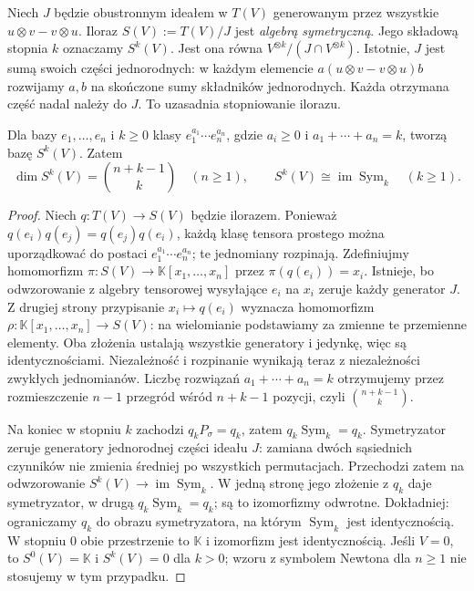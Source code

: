 \begin{definicja}
\label{def:algebra-symetryczna}
Niech $J$ będzie obustronnym ideałem w $T(V)$ generowanym
przez wszystkie $u\otimes v-v\otimes u$. Iloraz
$S(V):=T(V)/J$ jest \emph{algebrą symetryczną}.
Jego składową stopnia $k$ oznaczamy $S^k(V)$.
Jest ona równa $V^{\otimes k}/(J\cap V^{\otimes k})$.
Istotnie, $J$ jest sumą swoich części jednorodnych:
w każdym elemencie $a(u\otimes v-v\otimes u)b$ rozwijamy
$a,b$ na skończone sumy składników jednorodnych. Każda
otrzymana część nadal należy do $J$. To uzasadnia stopniowanie ilorazu.
\end{definicja}

\begin{stwierdzenie}
\label{prop:sym-baza}
Dla bazy $e_1,\ldots,e_n$ i $k\geq0$ klasy
$e_1^{a_1}\cdots e_n^{a_n}$, gdzie
$a_i\geq0$ i $a_1+\cdots+a_n=k$, tworzą bazę $S^k(V)$.
Zatem
\[
 \dim S^k(V)=\binom{n+k-1}{k}\quad(n\geq1),
 \qquad S^k(V)\cong\operatorname{im}\operatorname{Sym}_k\quad(k\geq1).
\]
\end{stwierdzenie}
\begin{proof}
Niech $q\colon T(V)\to S(V)$ będzie ilorazem.
Ponieważ $q(e_i)q(e_j)=q(e_j)q(e_i)$, każdą klasę tensora
prostego można uporządkować do postaci
$e_1^{a_1}\cdots e_n^{a_n}$; te jednomiany rozpinają.
Zdefiniujmy homomorfizm $\pi\colon S(V)\to
\mathbb K[x_1,\ldots,x_n]$ przez $\pi(q(e_i))=x_i$.
Istnieje, bo odwzorowanie z algebry tensorowej wysyłające $e_i$
na $x_i$ zeruje każdy generator $J$. Z drugiej strony
przypisanie $x_i\mapsto q(e_i)$ wyznacza homomorfizm
$\rho\colon\mathbb K[x_1,\ldots,x_n]\to S(V)$:
na wielomianie podstawiamy za zmienne te przemienne elementy.
Oba złożenia ustalają wszystkie generatory i jedynkę,
więc są identycznościami. Niezależność i rozpinanie
wynikają teraz z niezależności zwykłych jednomianów.
Liczbę rozwiązań $a_1+\cdots+a_n=k$ otrzymujemy przez
rozmieszczenie $n-1$ przegród wśród $n+k-1$ pozycji,
czyli $\binom{n+k-1}{k}$.

Na koniec w stopniu $k$ zachodzi $q_kP_\sigma=q_k$,
zatem $q_k\operatorname{Sym}_k=q_k$.
Symetryzator zeruje generatory jednorodnej części ideału
$J$: zamiana dwóch sąsiednich czynników nie zmienia
średniej po wszystkich permutacjach. Przechodzi zatem
na odwzorowanie $S^k(V)\to\operatorname{im}\operatorname{Sym}_k$.
W jedną stronę jego złożenie z $q_k$ daje symetryzator,
w drugą $q_k\operatorname{Sym}_k=q_k$; są to izomorfizmy odwrotne.
Dokładniej: ograniczamy $q_k$ do obrazu symetryzatora,
na którym $\operatorname{Sym}_k$ jest identycznością.
W stopniu $0$ obie przestrzenie to $\mathbb K$ i izomorfizm
jest identycznością. Jeśli $V=0$, to $S^0(V)=\mathbb K$
i $S^k(V)=0$ dla $k>0$; wzoru z symbolem Newtona dla $n\ge1$
nie stosujemy w tym przypadku.
\end{proof}

